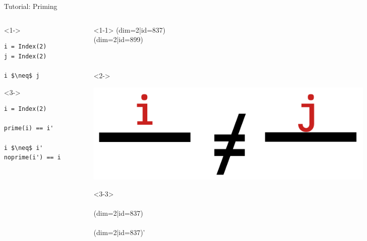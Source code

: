\begin{frame}[fragile]{Tutorial: Priming}

\begin{columns}

\begin{column}{4.5cm}

\begin{onlyenv}<1->
\begin{lstlisting}[language=JuliaLocal, style=julia, mathescape, basicstyle=\small]
i = Index(2)
j = Index(2)

i $\neq$ j
\end{lstlisting}
\end{onlyenv}

\begin{onlyenv}<3->
\begin{lstlisting}[language=JuliaLocal, style=julia, mathescape, basicstyle=\small]
i = Index(2)

prime(i) == i'

i $\neq$ i'
noprime(i') == i
\end{lstlisting}
\end{onlyenv}

\end{column}

\begin{column}{4.5cm}

\begin{onlyenv}<1-1>
\vspace*{0.05cm}
(dim=2|id=837) \\
(dim=2|id=899) \\
~\\
~\\
\end{onlyenv}

\begin{onlyenv}<2->
\begin{center}
\includegraphics[width=0.8\textwidth]{
  slides/assets/i_neq_j.png
}
\end{center}
\end{onlyenv}

\begin{onlyenv}<3-3>
~\\
~\\
(dim=2|id=837) \\
~\\
(dim=2|id=837)' \\
~\\
~\\
~\\
~\\
\end{onlyenv}


\end{column}
\end{columns}
\end{frame}
